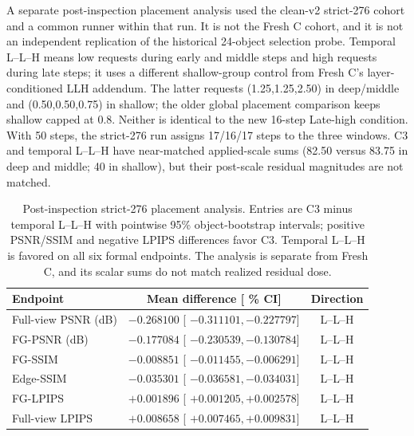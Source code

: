 \documentclass[times,twocolumn,final]{elsarticle}
\providecommand{\DIFadd}[1]{{\protect\color{blue} \sf #1}} %
\providecommand{\DIFaddbegin}{} %
\providecommand{\DIFaddend}{} %
\providecommand{\DIFaddFL}[1]{\DIFadd{#1}} %
\providecommand{\DIFaddbeginFL}{\DIFaddbegin} %
\providecommand{\DIFaddendFL}{\DIFaddend} %
\renewcommand{\DIFaddbeginFL}{}
\renewcommand{\DIFaddendFL}{}
\renewcommand{\DIFaddFL}[1]{#1}
\begin{document}
  \DIFaddbeginFL \DIFaddFL{A separate post-inspection placement analysis used the clean-v2 strict-276 cohort and a common runner within that run. It is not the Fresh C cohort, and it is not an independent replication of the historical 24-object selection probe. Temporal L--L--H means low requests during early and middle steps and high requests during late steps; it uses a different shallow-group control from Fresh C's layer-conditioned LLH addendum. The latter requests (1.25,1.25,2.50) in deep/middle and (0.50,0.50,0.75) in shallow; the older global placement comparison keeps shallow capped at 0.8. Neither is identical to the new 16-step Late-high condition. With 50 steps, the strict-276 run assigns 17/16/17 steps to the three windows. C3 and temporal L--L--H have near-matched applied-scale sums (82.50 versus 83.75 in deep and middle; 40 in shallow), but their post-scale residual magnitudes are not matched.
}

\begin{table}[t]
\DIFaddendFL \centering
  \DIFaddbegin \scriptsize
\setlength{\tabcolsep}{4pt}
\caption{Post-inspection strict-276 placement analysis. Entries are C3 minus temporal L--L--H with pointwise 95\% object-bootstrap intervals; positive PSNR/SSIM and negative LPIPS differences favor C3. Temporal L--L--H is favored on all six formal endpoints. The analysis is separate from Fresh C, and its scalar sums do not match realized residual dose.}
\label{tab:temporal-placement}
\begin{tabular}{lcc}
\toprule
\DIFadd{Endpoint }& \DIFadd{Mean difference }[\DIFadd{95\% CI}] & \DIFadd{Direction }\\
\midrule
\DIFadd{Full-view PSNR (dB) }& \DIFadd{$-0.268100$ }[\DIFadd{$-0.311101,-0.227797$}] & \DIFadd{L--L--H }\\
\DIFadd{FG-PSNR (dB) }& \DIFadd{$-0.177084$ }[\DIFadd{$-0.230539,-0.130784$}] & \DIFadd{L--L--H }\\
\DIFadd{FG-SSIM }& \DIFadd{$-0.008851$ }[\DIFadd{$-0.011455,-0.006291$}] & \DIFadd{L--L--H }\\
\DIFadd{Edge-SSIM }& \DIFadd{$-0.035301$ }[\DIFadd{$-0.036581,-0.034031$}] & \DIFadd{L--L--H }\\
\DIFadd{FG-LPIPS }& \DIFadd{$+0.001896$ }[\DIFadd{$+0.001205,+0.002578$}] & \DIFadd{L--L--H }\\
\DIFadd{Full-view LPIPS }& \DIFadd{$+0.008658$ }[\DIFadd{$+0.007465,+0.009831$}] & \DIFadd{L--L--H }\\
\bottomrule
\end{tabular}
\end{table}
\DIFaddend 
\end{document}
